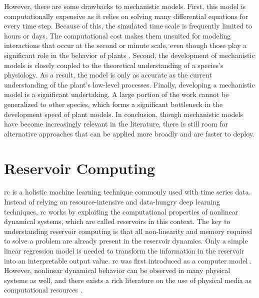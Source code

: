 However, there are some drawbacks to mechanistic models.
First, this model is computationally expensive as it relies on solving many differential equations for every time step. 
Because of this, the simulated time scale is frequently limited to hours or days. The computational cost makes them unsuited for modeling interactions that occur at the second or minute scale, even though those play a significant role in the behavior of plants \citep{pieters_reservoir_2022}.
Second, the development of mechanistic models is closely coupled to the theoretical understanding of a species's physiology. 
As a result, the model is only as accurate as the current understanding of the plant's low-level processes.
Finally, developing a mechanistic model is a significant undertaking. 
A large portion of the work cannot be generalized to other species, which forms a significant bottleneck in the development speed of plant models.
In conclusion, though mechanistic models have become increasingly relevant in the literature, there is still room for alternative approaches that can be applied more broadly and are faster to deploy.

\section{Reservoir Computing}

\acrfull{rc} is a holistic machine learning technique commonly used with time series data.
Instead of relying on resource-intensive and data-hungry deep learning techniques, \acrshort{rc} works by exploiting the computational properties of nonlinear dynamical systems, which are called reservoirs in this context.
The key to understanding reservoir computing is that all non-linearity and memory required to solve a problem are already present in the reservoir dynamics.
Only a simple linear regression model is needed to transform the information in the reservoir into an interpretable output value.
\acrshort{rc} was first introduced as a computer model \citep{jaeger_echo_2002, maass_real-time_2002, steil_backpropagation-decorrelation_2004}.
However, nonlinear dynamical behavior can be observed in many physical systems as well, and there exists a rich literature on the use of physical media as computational resources \citep{tanaka_recent_2019}.



